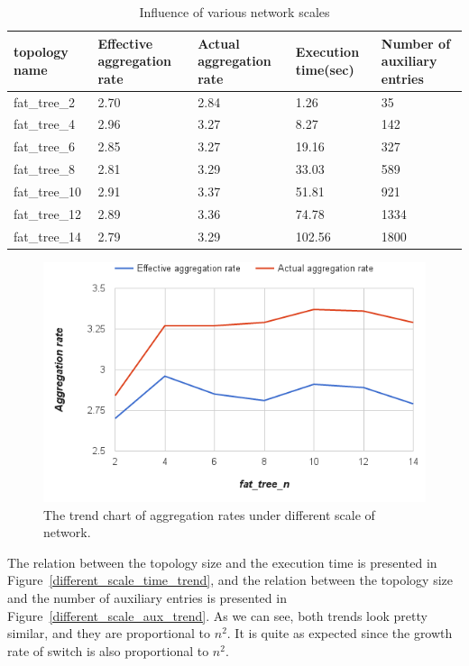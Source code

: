 \begin{table}
\centering
\caption{Influence of various network scales}
\begin{tabular}{|l|p{2.5cm}|p{2.5cm}|p{1.9cm}|p{2.8cm}|}
\hline topology name & Effective aggregation rate & Actual aggregation rate & Execution time(sec) & Number of auxiliary entries \\
\hline
\hline fat\_tree\_2 & 2.70 & 2.84 & 1.26 & 35 \\
\hline fat\_tree\_4 & 2.96 & 3.27 & 8.27 & 142 \\
\hline fat\_tree\_6 & 2.85 & 3.27 & 19.16 & 327 \\
\hline fat\_tree\_8 & 2.81 & 3.29 & 33.03 & 589 \\
\hline fat\_tree\_10 & 2.91 & 3.37 & 51.81 & 921 \\
\hline fat\_tree\_12 & 2.89 & 3.36 & 74.78 & 1334 \\
\hline fat\_tree\_14 & 2.79 & 3.29 & 102.56 & 1800 \\
\hline
\end{tabular}
\label{table:different_scale}
\end{table}

\begin{figure}[H]
\begin{center} 
\includegraphics[width=1\textwidth]{figures/exp_scale_rate_trend.png}
\end{center}
\caption{The trend chart of aggregation rates under different scale of network.}
\label{different_scale_rate_trend}
\end{figure}

The relation between the topology size and the execution time is presented in Figure~\ref{different_scale_time_trend}, and the relation between the topology size and the number of auxiliary entries is presented in Figure~\ref{different_scale_aux_trend}. As we can see, both trends look pretty similar, and they are proportional to $n^2$. It is quite as expected since the growth rate of switch is also proportional to $n^2$.

